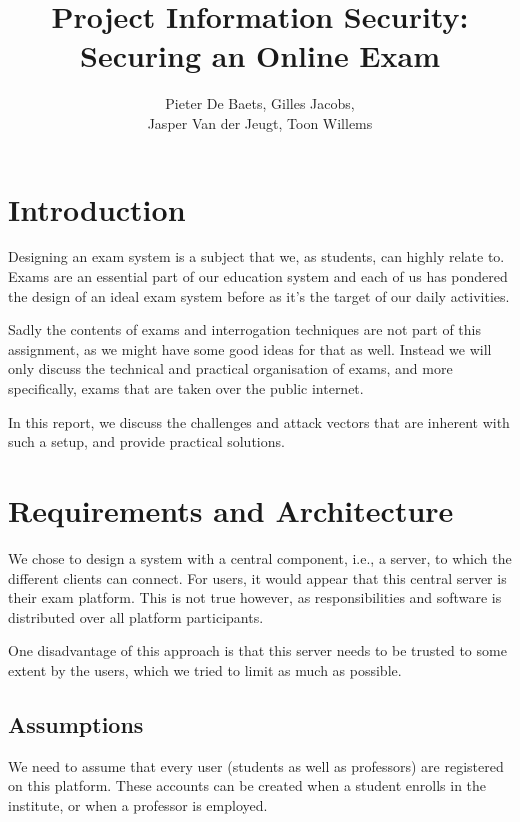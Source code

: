 \documentclass[12pt]{article}
\title{Project Information Security: \\ \textbf{Securing an Online Exam}}
\author{Pieter De Baets, Gilles Jacobs,\\ Jasper Van der Jeugt, Toon Willems}
\begin{document}
\maketitle
\newpage
\tableofcontents

\newpage

\section{Introduction}
\label{sec:introduction}

Designing an exam system is a subject that we, as students, can highly relate
to. Exams are an essential part of our education system and each of us has
pondered the design of an ideal exam system before as it's the target of our
daily activities.

Sadly the contents of exams and interrogation techniques are not part of this
assignment, as we might have some good ideas for that as well. Instead we will
only discuss the technical and practical organisation of exams, and more
specifically, exams that are taken over the public internet.

In this report, we discuss the challenges and attack vectors that are inherent
with such a setup, and provide practical solutions.

\section{Requirements and Architecture}
\label{sec:requirements}

We chose to design a system with a central component, i.e., a server, to which
the different clients can connect. For users, it would appear that this central
server is their exam platform. This is not true however, as responsibilities and
software is distributed over all platform participants.

One disadvantage of this approach is that this server needs to be trusted to
some extent by the users, which we tried to limit as much as possible.

\subsection{Assumptions}
\label{subsec:req-assumptions}

We need to assume that every user (students as well as professors) are
registered on this platform. These accounts can be created when a student
enrolls in the institute, or when a professor is employed.
\end{document}

